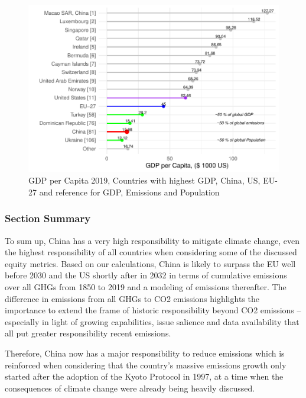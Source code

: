 \documentclass[
  12pt,
]{article}
\numberwithin{equation}{section}
\numberwithin{table}{section}
\numberwithin{figure}{section}
\begin{document}
\begin{figure}
\centering
\includegraphics{Paper_files/figure-latex/unnamed-chunk-16-1.pdf}
\caption{GDP per Capita 2019, Countries with highest GDP, China, US,
EU-27 and reference for GDP, Emissions and Population}
\end{figure}

\hypertarget{section-summary-1}{%
\subsubsection{Section Summary}\label{section-summary-1}}

To sum up, China has a very high responsibility to mitigate climate
change, even the highest responsibility of all countries when
considering some of the discussed equity metrics. Based on our
calculations, China is likely to surpass the EU well before 2030 and the
US shortly after in 2032 in terms of cumulative emissions over all GHGs
from 1850 to 2019 and a modeling of emissions thereafter. The difference
in emissions from all GHGs to CO2 emissions highlights the importance to
extend the frame of historic responsibility beyond CO2 emissions --
especially in light of growing capabilities, issue salience and data
availability that all put greater responsibility recent emissions.

Therefore, China now has a major responsibility to reduce emissions
which is reinforced when considering that the country's massive
emissions growth only started after the adoption of the Kyoto Protocol
in 1997, at a time when the consequences of climate change were already
being heavily discussed.
\end{document}
